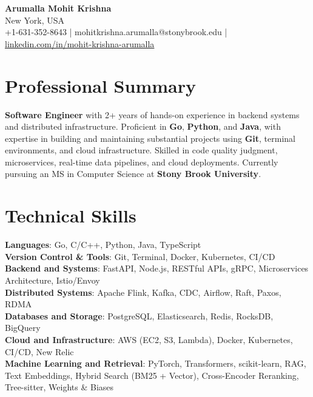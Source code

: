 \documentclass[letterpaper,11pt]{article}
\begin{document}
\begin{center}
  {\Large \textbf{Arumalla Mohit Krishna}} \\
  New York, USA \\
  +1-631-352-8643 \enspace | \enspace mohitkrishna.arumalla@stonybrook.edu \enspace | \enspace \href{https://www.linkedin.com/in/mohit-krishna-arumalla}{linkedin.com/in/mohit-krishna-arumalla}
\end{center}

\section{Professional Summary}
  \begin{itemize}[leftmargin=0.15in, label={}]
    \small{\item{
     \textbf{Software Engineer} with 2+ years of hands-on experience in backend systems and distributed infrastructure. Proficient in \textbf{Go}, \textbf{Python}, and \textbf{Java}, with expertise in building and maintaining substantial projects using \textbf{Git}, terminal environments, and cloud infrastructure. Skilled in code quality judgment, microservices, real-time data pipelines, and cloud deployments. Currently pursuing an MS in Computer Science at \textbf{Stony Brook University}.
    }}
  \end{itemize}
\vspace{-16pt}

\section{Technical Skills}
 \begin{itemize}[leftmargin=0.15in, label={}]
    \small{\item{
     \textbf{Languages}: Go, C/C++, Python, Java, TypeScript \\
     \textbf{Version Control \& Tools}: Git, Terminal, Docker, Kubernetes, CI/CD \\
     \textbf{Backend and Systems}: FastAPI, Node.js, RESTful APIs, gRPC, Microservices Architecture, Istio/Envoy \\
     \textbf{Distributed Systems}: Apache Flink, Kafka, CDC, Airflow, Raft, Paxos, RDMA \\
     \textbf{Databases and Storage}: PostgreSQL, Elasticsearch, Redis, RocksDB, BigQuery \\
     \textbf{Cloud and Infrastructure}: AWS (EC2, S3, Lambda), Docker, Kubernetes, CI/CD, New Relic \\
     \textbf{Machine Learning and Retrieval}: PyTorch, Transformers, scikit-learn, RAG, Text Embeddings, Hybrid Search (BM25 + Vector), Cross-Encoder Reranking, Tree-sitter, Weights \& Biases
    }}
 \end{itemize}
\vspace{-16pt}
\end{document}
